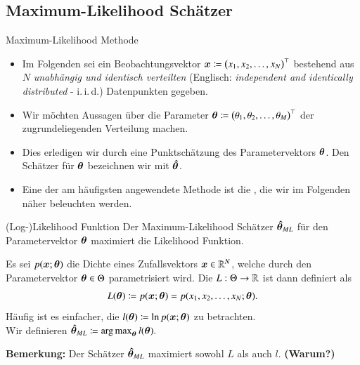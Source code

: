 \subsection{Maximum-Likelihood Schätzer}

\begin{frame}{Maximum-Likelihood Methode}{}
	\begin{itemize}
		\item Im Folgenden sei ein Beobachtungsvektor $\bm{x} \coloneqq \bigl( x_1, x_2, \ldots, x_N \bigr)^\top$
			bestehend aus $N$ \textit{unabhängig und identisch verteilten}
			(Englisch: \textit{independent and identically distributed} - i.\,i.\,d.) Datenpunkten gegeben.
		\item Wir möchten Aussagen über die Parameter $\bm{\theta} \coloneqq \bigl( \theta_1, \theta_2, \ldots, \theta_M \bigr)^\top$
			der zugrundeliegenden Verteilung machen.
		\item Dies erledigen wir durch eine Punktschätzung des Parametervektors $\bm{\theta}$.
			Den Schätzer für $\bm{\theta}$ bezeichnen wir mit $\bm{\hat{\theta}}$.
		\item Eine der am häufigsten angewendete Methode ist die ,
			die wir im Folgenden näher beleuchten werden.
	\end{itemize}
\end{frame}


\begin{frame}{(Log-)Likelihood Funktion}{}
	Der Maximum-Likelihood Schätzer $\bm{\hat{\theta}}_{ML}$ für den Parametervektor $\bm{\theta}$ maximiert die Likelihood Funktion.
	
	\begin{mydef}
		Es sei $p(\bm{x}; \bm{\theta})$ die Dichte eines Zufallsvektors $\bm{x} \in \mathbb{R}^N$, welche durch den
		Parametervektor $\bm{\theta} \in \Theta$ parametrisiert wird.
		Die  $L : \Theta \rightarrow \mathbb{R}$ ist dann definiert als
		\begin{equation*}
			L(\bm{\theta}) \coloneqq p(\bm{x}; \bm{\theta}) = p(x_1, x_2, \ldots, x_N; \bm{\theta}).
		\end{equation*}
		Häufig ist es einfacher, die  $l(\bm{\theta}) \coloneqq \ln p(\bm{x}; \bm{\theta})$ zu betrachten. \\
		Wir definieren $\bm{\hat{\theta}}_{ML} \coloneqq \operatorname{arg\,max}_{\bm{\theta}} l(\bm{\theta}).$
	\end{mydef}

	\begin{boxGray}
		\textbf{Bemerkung:} Der Schätzer $\bm{\hat{\theta}}_{ML}$ maximiert sowohl $L$ als auch $l$. \textbf{(Warum?)}
	\end{boxGray}
\end{frame}


